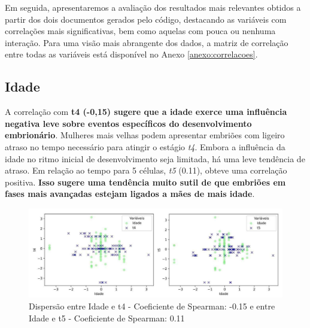 Em seguida, apresentaremos a avaliação dos resultados mais relevantes obtidos a partir dos dois documentos gerados pelo código, destacando as variáveis com correlações mais significativas, bem como aquelas com pouca ou nenhuma interação. Para uma visão mais abrangente dos dados, a matriz de correlação entre todas as variáveis está disponível no Anexo \ref{anexo:correlacoes}.

\subsection*{Idade}
A correlação com \textbf{t4 (-0,15) sugere que a idade exerce uma influência negativa leve sobre eventos específicos do desenvolvimento embrionário}. Mulheres mais velhas podem apresentar embriões com ligeiro atraso no tempo necessário para atingir o estágio \textit{t4}. Embora a influência da idade no ritmo inicial de desenvolvimento seja limitada, há uma leve tendência de atraso. Em relação ao tempo para 5 células, \textit{t5} (0.11), obteve uma correlação positiva.\textbf{ Isso sugere uma tendência muito sutil de que embriões em fases mais avançadas estejam ligados a mães de mais idade}.

\begin{figure}[h]
    \captionsetup{font=footnotesize, justification=centering, labelsep=period, position=above}
    \caption{Dispersão entre Idade e t4 - Coeficiente de Spearman: -0.15 e entre Idade e t5 - Coeficiente de Spearman: 0.11}
    \label{fig:idade-t4-t5}
    \centering
    \includegraphics[scale=0.4]{figuras/Spearman/idade-t4-t5.pdf}
    \vspace{0.3cm} 
    \begin{minipage}{\linewidth}
        \centering
    \end{minipage}
\end{figure}
\FloatBarrier 

